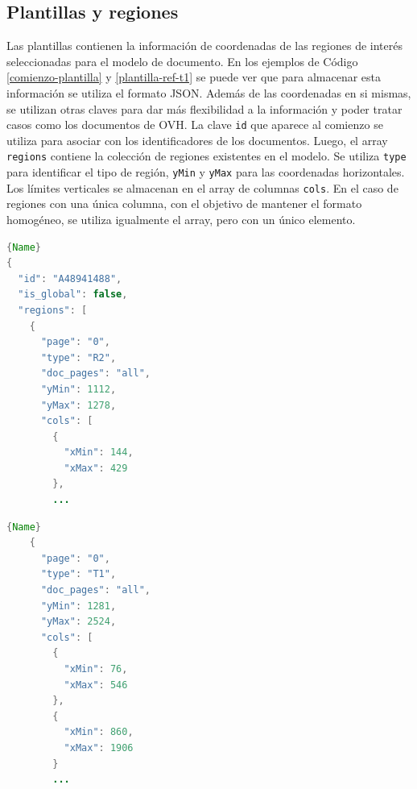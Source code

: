 \subsection{Plantillas y regiones}


Las plantillas contienen la información de coordenadas de las regiones de interés seleccionadas para el modelo de documento. En los ejemplos de Código \ref{comienzo-plantilla} y \ref{plantilla-ref-t1} se puede ver que para almacenar esta información se utiliza el formato JSON. Además de las coordenadas en si mismas, se utilizan otras claves para dar más flexibilidad a la información y poder tratar casos como los documentos de OVH. La clave \verb|id| que aparece al comienzo se utiliza para asociar con los identificadores de los documentos. Luego, el array \verb|regions| contiene la colección de regiones existentes en el modelo. Se utiliza \verb|type| para identificar el tipo de región, \verb|yMin| y \verb|yMax| para las coordenadas horizontales. Los límites verticales se almacenan en el array de columnas \verb|cols|. En el caso de regiones con una única columna, con el objetivo de mantener el formato homogéneo, se utiliza igualmente el array, pero con un único elemento.

\noindent\begin{minipage}{.45\textwidth}
    \begin{lstlisting}[language=Java,caption={Comienzo de la plantilla},label={comienzo-plantilla}]{Name}
{
  "id": "A48941488",
  "is_global": false,
  "regions": [
    {
      "page": "0",
      "type": "R2",
      "doc_pages": "all",
      "yMin": 1112,
      "yMax": 1278,
      "cols": [
        {
          "xMin": 144,
          "xMax": 429
        },
        ...
    \end{lstlisting}
\end{minipage}\hfill
\begin{minipage}{.45\textwidth}
    \begin{lstlisting}[language=Java,caption={Región T1},label={plantilla-ref-t1}]{Name}
    {
      "page": "0",
      "type": "T1",
      "doc_pages": "all",
      "yMin": 1281,
      "yMax": 2524,
      "cols": [
        {
          "xMin": 76,
          "xMax": 546
        },
        {
          "xMin": 860,
          "xMax": 1906
        }
        ...
    \end{lstlisting}
\end{minipage}

